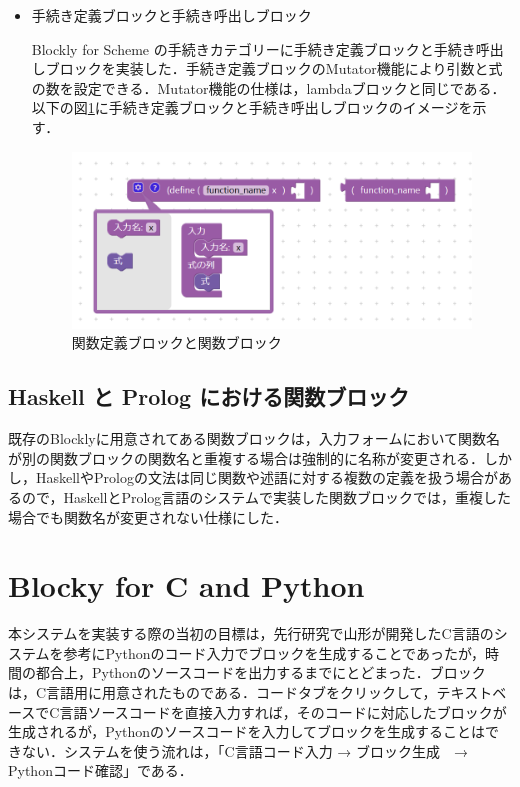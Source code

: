 \documentclass{risepaper}
\begin{document}
\begin{itemize}
\item 手続き定義ブロックと手続き呼出しブロック

Blockly for Scheme の手続きカテゴリーに手続き定義ブロックと手続き呼出しブロックを実装した．手続き定義ブロックのMutator機能により引数と式の数を設定できる．Mutator機能の仕様は，lambdaブロックと同じである．以下の図\ref{fig:scheme_func}に手続き定義ブロックと手続き呼出しブロックのイメージを示す．

\begin{figure}[h]
\begin{center}
\includegraphics[scale=0.5]{img/scheme_func.PNG}
\caption{関数定義ブロックと関数ブロック}%
\label{fig:scheme_func}
\end{center}%
\end{figure}%

\end{itemize} 

   \subsection{Haskell と Prolog における関数ブロック}
   
既存のBlocklyに用意されてある関数ブロックは，入力フォームにおいて関数名が別の関数ブロックの関数名と重複する場合は強制的に名称が変更される．しかし，HaskellやPrologの文法は同じ関数や述語に対する複数の定義を扱う場合があるので，HaskellとProlog言語のシステムで実装した関数ブロックでは，重複した場合でも関数名が変更されない仕様にした．

   \section{Blocky for C and Python}
   
本システムを実装する際の当初の目標は，先行研究で山形が開発したC言語のシステムを参考にPythonのコード入力でブロックを生成することであったが，時間の都合上，Pythonのソースコードを出力するまでにとどまった．ブロックは，C言語用に用意されたものである．コードタブをクリックして，テキストベースでC言語ソースコードを直接入力すれば，そのコードに対応したブロックが生成されるが，Pythonのソースコードを入力してブロックを生成することはできない．システムを使う流れは，「C言語コード入力 → ブロック生成　→ Pythonコード確認」である．
\end{document}
